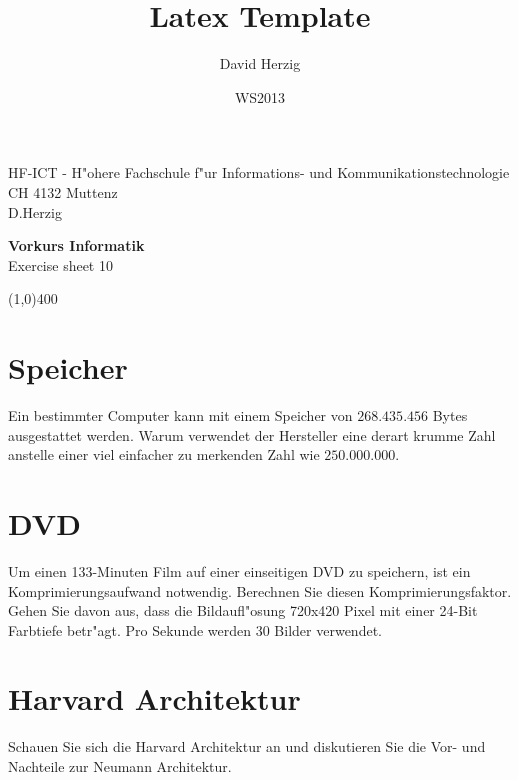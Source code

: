 \documentclass[a4paper,10pt]{article}
\title{Latex Template}
\author{David Herzig}
\date{WS2013}
\begin{document}
HF-ICT - H"ohere Fachschule f"ur Informations- und Kommunikationstechnologie\\
CH 4132 Muttenz\\
D.Herzig

\vspace{2mm}

\begin{center}
{\Large \bf Vorkurs Informatik}\\
Exercise sheet 10
\end{center}

\vspace{2mm}

\line(1,0){400}

\vspace{5mm}

\section{Speicher}
Ein bestimmter Computer kann mit einem Speicher von $268.435.456$ Bytes ausgestattet werden.
Warum verwendet der Hersteller eine derart krumme Zahl anstelle einer viel einfacher zu
merkenden Zahl wie $250.000.000$.

\section{DVD}
Um einen 133-Minuten Film auf einer einseitigen DVD zu speichern, ist ein Komprimierungsaufwand
notwendig. Berechnen Sie diesen Komprimierungsfaktor.\\
Gehen Sie davon aus, dass die Bildaufl"osung 720x420 Pixel mit einer 24-Bit Farbtiefe betr"agt.
Pro Sekunde werden 30 Bilder verwendet.

\section{Harvard Architektur}
Schauen Sie sich die Harvard Architektur an und diskutieren Sie die Vor- und Nachteile zur
Neumann Architektur.
\end{document}
